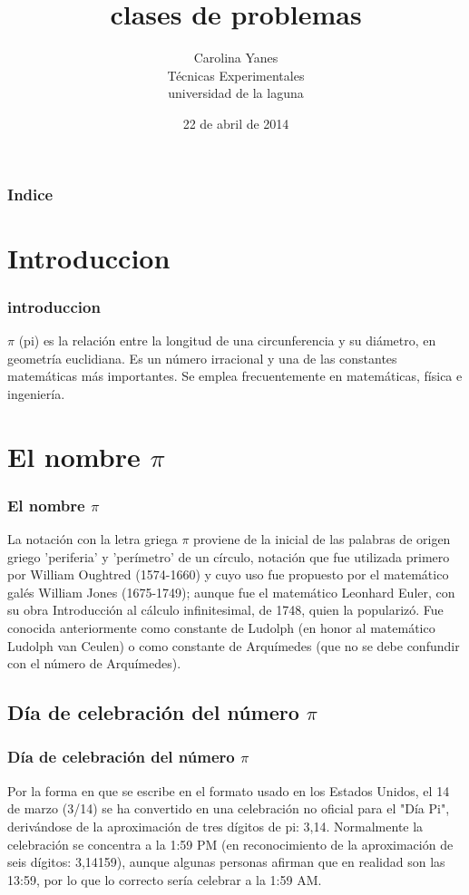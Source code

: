 \documentclass{beamer}
\title[Presentación con Beamer]{clases de problemas}
\author[Carolina]{Carolina Yanes\\
                                 Técnicas Experimentales\\
                                 universidad de la laguna
                 }
\date[22 de abril de 2014]{22 de abril de 2014}
\begin{document}
\begin{frame}
\titlepage
\end{frame}

\begin{frame}
\frametitle{Indice}
\tableofcontents[pausesections]
\end{frame}

\section{Introduccion}
\begin{frame}
\frametitle{introduccion}
$\pi$ (pi) es la relaci\' on entre la longitud de una circunferencia y su di\' ametro, en geometr\' ia euclidiana. 
 Es un n\' umero irracional y una de las constantes matem\' aticas m\' as importantes. Se emplea frecuentemente 
 en matem\' aticas, f\' isica e ingenier\' ia. 
\end{frame}

\section{El nombre $\pi$}
\begin{frame}
\frametitle{El nombre $\pi$}
La notaci\' on con la letra griega $\pi$ proviene de la inicial de las palabras de origen griego 'periferia' y 'per\' imetro' de un c\' irculo, notaci\' on que fue utilizada primero por William Oughtred (1574-1660) y cuyo uso fue propuesto por el matem\' atico gal\' es William Jones (1675-1749); aunque fue el matem\' atico Leonhard Euler, con su obra Introducci\' on al c\' alculo infinitesimal, de 1748, quien la populariz\' o. Fue conocida anteriormente como constante de Ludolph (en honor al matemático Ludolph van Ceulen) o como constante de Arqu\' imedes (que no se debe confundir con el n\' umero de Arqu\' imedes).
\end{frame}

\subsection{ D\' ia de celebraci\' on del n\' umero $\pi$}
\begin{frame}
\frametitle{D\' ia de celebraci\' on del n\' umero $\pi$}
Por la forma en que se escribe en el formato usado en los Estados Unidos, el 14 de marzo (3/14) se ha convertido en una celebraci\' on no oficial para el "D\' ia Pi", deriv\' andose de la aproximaci\' on de tres d\' igitos de pi: 3,14. Normalmente la celebraci\' on se concentra a la 1:59 PM (en reconocimiento de la aproximaci\' on de seis d\' igitos: 3,14159), aunque algunas personas afirman que en realidad son las 13:59, por lo que lo correcto ser\' ia celebrar a la 1:59 AM.
\end{frame}
\end{document}
